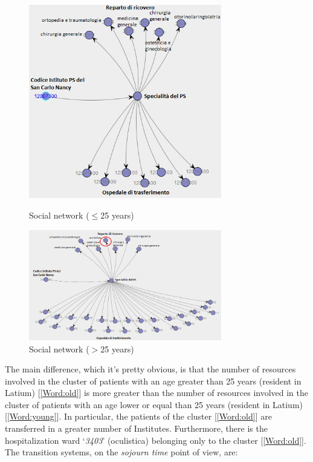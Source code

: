 \begin{figure} [htbp]
\includegraphics[width=0.75\textwidth, keepaspectratio]{ProntoSoccorsoHoWYoungs}
\caption{Social network ($\leq$25 years)}
\includegraphics[width=0.75\textwidth, keepaspectratio]{ProntoSoccorsoHoWOlds}
\caption{Social network ($>$25 years)}
\end{figure}
\noindent
The main difference, which it’s pretty obvious, is that the number of resources involved in the cluster of patients with an age greater than 25 years (resident in Latium) [\ref{Word:old}] is more greater than the number of resources involved in the cluster of patients with an age lower or equal than 25 years (resident in Latium) [\ref{Word:young}]. In particular, the patients of the cluster [\ref{Word:old}] are transferred in a greater number of Institutes. Furthermore, there is the hospitalization ward `\textit{3403}' (oculistica) belonging only to the cluster [\ref{Word:old}]. The transition systems, on the \textit{sojourn time} point of view, are:

